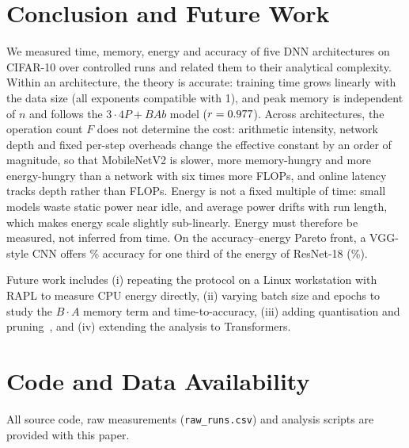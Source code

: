 \documentclass[conference]{IEEEtran}
\begin{document}
\section{Conclusion and Future Work}
We measured time, memory, energy and accuracy of five DNN architectures on CIFAR-10 over \nruns{} controlled runs and
related them to their analytical complexity. Within an architecture, the theory is accurate: training time grows
linearly with the data size (all exponents compatible with 1), and peak memory is independent of $n$ and follows the
$3\cdot4P + BAb$ model ($r=0.977$). Across architectures, the operation count $F$ does not determine the cost:
arithmetic intensity, network depth and fixed per-step overheads change the effective constant by an order of
magnitude, so that MobileNetV2 is slower, more memory-hungry and more energy-hungry than a network with six times more
FLOPs, and online latency tracks depth rather than FLOPs. Energy is not a fixed multiple of time: small models waste
static power near idle, and average power drifts with run length, which makes energy scale slightly sub-linearly.
Energy must therefore be measured, not inferred from time. On the accuracy--energy Pareto front, a VGG-style CNN
offers \accMedium\% accuracy for one third of the energy of ResNet-18 (\accRes\%).

Future work includes (i) repeating the protocol on a Linux workstation with RAPL to measure CPU energy directly,
(ii) varying batch size and epochs to study the $B\cdot A$ memory term and time-to-accuracy, (iii) adding
quantisation and pruning~\cite{iyer2026greenai}, and (iv) extending the analysis to Transformers.

\section*{Code and Data Availability}
All source code, raw measurements (\texttt{raw\_runs.csv}) and analysis scripts are provided with this paper.



\end{document}
